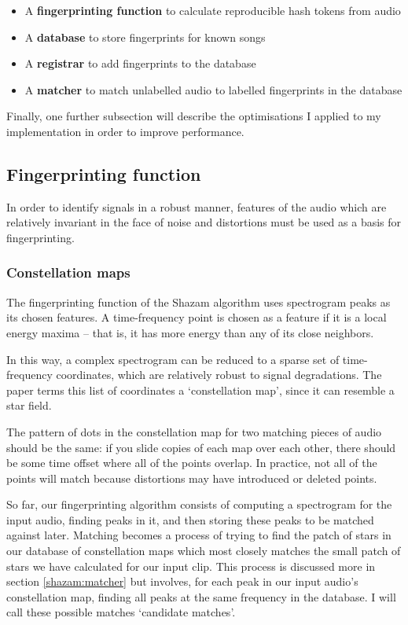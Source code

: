 \documentclass[12pt,a4paper,twoside,openright]{report}
\begin{document}
\begin{itemize}
  \item A \textbf{fingerprinting function} to calculate reproducible hash tokens from audio
  \item A \textbf{database} to store fingerprints for known songs
  \item A \textbf{registrar} to add fingerprints to the database
  \item A \textbf{matcher} to match unlabelled audio to labelled fingerprints in the database
\end{itemize}

Finally, one further subsection will describe the optimisations I applied to my implementation in order to improve performance.

\subsection{Fingerprinting function}

In order to identify signals in a robust manner, features of the audio which are relatively invariant in the face of noise and distortions must be used as a basis for fingerprinting.

\subsubsection{Constellation maps}

The fingerprinting function of the Shazam algorithm uses spectrogram peaks as its chosen features. A time-frequency point is chosen as a feature if it is a local energy maxima -- that is, it has more energy than any of its close neighbors.

In this way, a complex spectrogram can be reduced to a sparse set of time-frequency coordinates, which are relatively robust to signal degradations. The paper terms this list of coordinates a `constellation map', since it can resemble a star field. 

The pattern of dots in the constellation map for two matching pieces of audio should be the same: if you slide copies of each map over each other, there should be some time offset where all of the points overlap. In practice, not all of the points will match because distortions may have introduced or deleted points.

So far, our fingerprinting algorithm consists of computing a spectrogram for the input audio, finding peaks in it, and then storing these peaks to be matched against later. Matching becomes a process of trying to find the patch of stars in our database of constellation maps which most closely matches the small patch of stars we have calculated for our input clip. This process is discussed more in section \ref{shazam:matcher} but involves, for each peak in our input audio's constellation map, finding all peaks at the same frequency in the database. I will call these possible matches `candidate matches'.
\end{document}
